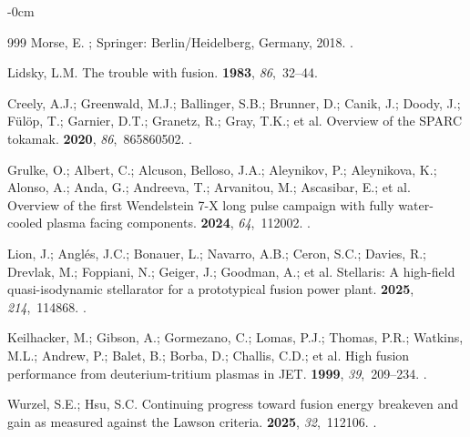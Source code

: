 \documentclass[particles,article,accept,pdftex,moreauthors]{Definitions/mdpi}
\begin{document}
\begin{adjustwidth}{-\extralength}{0cm}
\begin{thebibliography}{999}
Morse, E.
; Springer: Berlin/Heidelberg, Germany,  2018.
.

Lidsky, L.M.
\newblock The trouble with fusion.
 {\bf 1983}, {\em 86},~32--44.

Creely, A.J.; Greenwald, M.J.; Ballinger, S.B.; Brunner, D.; Canik, J.; Doody, J.; Fülöp, T.; Garnier, D.T.; Granetz, R.; Gray, T.K.; et al.
\newblock Overview of the {SPARC} tokamak.
 {\bf 2020}, {\em 86},~865860502.
.

Grulke, O.; Albert, C.;  Alcuson, Belloso, J.A.; Aleynikov, P.; Aleynikova, K.; Alonso, A.; Anda, G.; Andreeva, T.; Arvanitou, M.; Ascasibar, E.; et al.
\newblock Overview of the first {Wendelstein 7-X} long pulse campaign with
  fully water-cooled plasma facing components.
 {\bf 2024}, {\em 64},~112002.
.

Lion, J.; Angl{\'e}s, J.C.;  Bonauer, L.; Navarro, A.B.; Ceron, S.C.; Davies, R.; Drevlak, M.; Foppiani, N.; Geiger, J.; Goodman, A.; et al.
\newblock Stellaris: A high-field quasi-isodynamic stellarator for a
  prototypical fusion power plant.
 {\bf 2025}, {\em 214},~114868.
.

Keilhacker, M.; Gibson, A.;  Gormezano, C.; Lomas, P.J.; Thomas, P.R.; Watkins, M.L.; Andrew, P.; Balet, B.; Borba, D.; Challis, C.D.; et al.
\newblock High fusion performance from deuterium-tritium plasmas in {JET}.
 {\bf 1999}, {\em 39},~209--234.
.

Wurzel, S.E.; Hsu, S.C.
\newblock Continuing progress toward fusion energy breakeven and gain as
  measured against the Lawson criteria.
 {\bf 2025}, {\em 32},~112106.
.


\end{thebibliography}
\end{adjustwidth}
\end{document}
